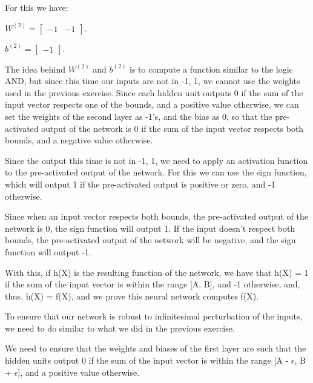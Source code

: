 \documentclass{article}
\begin{document}
\bigskip

For this we have:

\bigskip

\( W^{(2)} = \begin{bmatrix}
    -1 & -1
\end{bmatrix}
\).

\bigskip

\(b^{(2)} = \begin{bmatrix}
    -1
\end{bmatrix}
\).

\bigskip

The idea behind \(W^{(2)}\) and \(b^{(2)}\) is to compute a function similar to the logic AND, but since this time our inputs are not in 
{-1, 1}, we cannot use the weights used in the previous exercise.
Since each hidden unit outputs 0 if the sum of the input vector respects one of the bounds, and a positive value otherwise, we can set the 
weights of the second layer as -1's, and the bias as 0, so that the pre-activated output of the network is 0 if the sum of the input vector 
respects both bounds, and a negative value otherwise.

\bigskip

Since the output this time is not in {-1, 1}, we need to apply an activation function to the pre-activated output of the network. For this we can use
the sign function, which will output 1 if the pre-activated output is positive or zero, and -1 otherwise.

Since when an input vector respects both bounds, the pre-activated output of the network is 0, the sign function will output 1. If the input doesn't
respect both bounds, the pre-activated output of the network will be negative, and the sign function will output -1.

With this, if h(X) is the resulting function of the network, we have that h(X) = 1 if the sum of the input vector is within the range [A, B], 
and -1 otherwise, and, thus, h(X) = f(X), and we prove this neural network computes f(X).

\bigskip

To ensure that our network is robust to infinitesimal perturbation of the inputs, we need to do similar to what we did in the previous exercise.

We need to ensure that the weights and biases of the first layer are such that the hidden units output 0 if the sum of the input vector is 
within the range [A - $\epsilon$, B + $\epsilon$], and a positive value otherwise.
\end{document}
